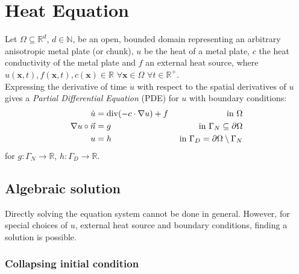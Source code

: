 \documentclass{IOS-Book-Article}
\theoremstyle{plain}
\theoremstyle{definition}
\DeclareMathOperator{\diverg}{div}
\begin{document}
\newpage
\section{Heat Equation}

Let $\Omega \subseteq \mathbb{R}^d$, $d \in \mathbb{N}$, be an open, bounded domain representing an arbitrary anisotropic metal plate (or chunk), $u$ be the heat of a metal plate, $c$ the heat conductivity of the metal plate and $f$ an external heat source, where
$u(\mathbf x, t), f(\mathbf x, t), c(\mathbf x) \in \mathbb{R}$ $\forall \mathbf x \in \Omega$ $\forall t \in \mathbb{R}^{+}$.\\
Expressing the derivative of time $\dot u$ with respect to the spatial derivatives of $u$ gives a \textit{Partial Differential Equation} (PDE) for $u$ with boundary conditions:
\begin{align}
	\dot u &= \diverg (- c \cdot \nabla u) + f & \textnormal{ in } \Omega \\
	\nabla u \circ \vec{n} &= g & \textnormal{ in } \Gamma_N \subseteq \partial \Omega \\
	u  &= h & \textnormal{ in } \Gamma_D = \partial \Omega \setminus \Gamma_N
\end{align}
for $g: \Gamma_N \rightarrow \mathbb{R}$, $h: \Gamma_D \rightarrow \mathbb{R}$.

\subsection{Algebraic solution}

Directly solving the equation system cannot be done in general. However, for special choices of $u$, external heat source and boundary conditions, finding a solution is possible.

\subsubsection{Collapsing initial condition}
\end{document}
